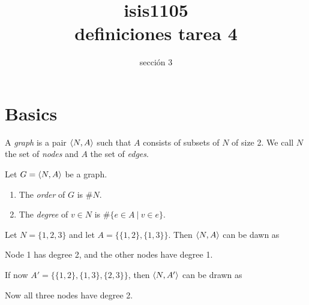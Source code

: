 \documentclass{amsart}
\title{isis1105 \\ definiciones tarea 4}
\author{sección 3}
\begin{document}
\maketitle

\section{Basics} 

\begin{defn}
    A \emph{graph} is a pair $\langle N, A \rangle$ such that $A$ consists of subsets of $N$ of size 2. We call $N$ the set of \emph{nodes} and $A$ the set of \emph{edges}.
\end{defn}

\begin{defn}
    Let $G = \langle N,A \rangle$ be a graph.
    \begin{enumerate}
        \item The \emph{order} of $G$ is $\#N$.
        \item The \emph{degree} of $v \in N$ is $\# \{e \in A \ | \ v  \in e\}$.
    \end{enumerate}
\end{defn}

\begin{exl}
    Let $N = \{ 1, 2, 3 \}$ and let $A = \{ \{ 1, 2 \}, \{ 1, 3 \} \}$. Then $\langle N, A \rangle$ can be dawn as

    \begin{center}
    \end{center}

    Node 1 has degree 2, and the other nodes have degree 1.

    If now $A' =\{ \{ 1, 2 \}, \{ 1, 3 \}, \{ 2, 3 \} \}$, then $\langle N, A' \rangle$ can be drawn as

    \begin{center}
    \end{center}

    Now all three nodes have degree 2.

\end{exl}
\end{document}
